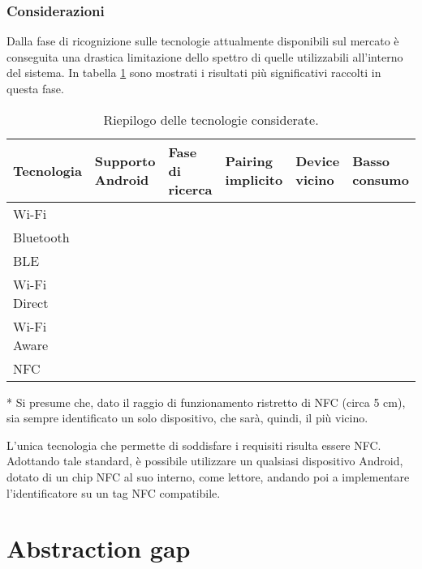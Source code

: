 \documentclass[a4paper,12pt]{report}
\newcommand{\cmark}{\ding{51}}
\newcommand{\xmark}{\ding{55}}
\begin{document}
\subsubsection{Considerazioni}
Dalla fase di ricognizione sulle tecnologie attualmente disponibili sul mercato è conseguita una drastica limitazione dello spettro di quelle utilizzabili all'interno del sistema. In tabella \ref{tec-table} sono mostrati i risultati più significativi raccolti in questa fase.

\begin{table}[h]
	\centering
	\begin{threeparttable}
		\begin{tabular}{| >{\centering}m{} | >{\centering}m{} | >{\centering}m{} | >{\centering}m{} | >{\centering}m{} | >{\centering}m{} | }
			\hline
			\textbf{Tecnologia} & \textbf{Supporto Android} & \textbf{Fase di ricerca} & \textbf{Pairing implicito} & \textbf{Device vicino} & \textbf{Basso consumo} \tabularnewline
			\hline
			Wi-Fi & \cmark & \xmark & \xmark & \xmark & \xmark \tabularnewline
			\hline
			Bluetooth & \cmark & \cmark & \xmark & \xmark & \xmark \tabularnewline
			\hline
			BLE & \cmark & \cmark & \cmark & \xmark & \cmark \tabularnewline
			\hline
			Wi-Fi Direct & \cmark & \cmark & \cmark & \xmark & \xmark \tabularnewline
			\hline
			Wi-Fi Aware & \cmark & \cmark & \cmark & \xmark & \xmark \tabularnewline
			\hline
			NFC & \cmark & \cmark & \cmark & \cmark \tnote{*} & \cmark \tabularnewline
			\hline
		\end{tabular}
		\begin{tablenotes} \footnotesize
			\item[*] Si presume che, dato il raggio di funzionamento ristretto di NFC (circa 5 cm), sia sempre identificato un solo dispositivo, che sarà, quindi, il più vicino.
		\end{tablenotes}
	\end{threeparttable}
	\caption{Riepilogo delle tecnologie considerate.}
	\label{tec-table}
\end{table}

L'unica tecnologia che permette di soddisfare i requisiti risulta essere NFC. Adottando tale standard, è possibile utilizzare un qualsiasi dispositivo Android, dotato di un chip NFC al suo interno, come lettore, andando poi a implementare l'identificatore su un tag NFC compatibile.

\section{Abstraction gap}
\end{document}
